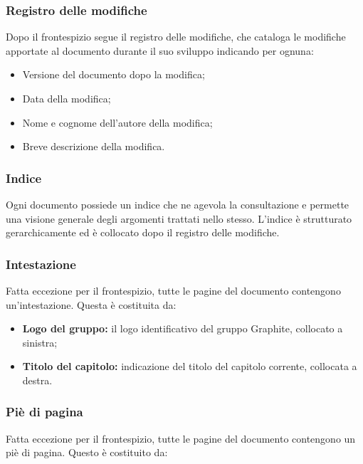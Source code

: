 \documentclass[../NormediProgetto.tex]{subfiles}
\begin{document}
\subsubsection{Registro delle modifiche}

Dopo il frontespizio segue il registro delle modifiche, che cataloga le modifiche apportate al documento durante il suo sviluppo indicando per ognuna:

\begin{itemize}
	\item Versione del documento dopo la modifica;
	\item Data della modifica;
	\item Nome e cognome dell'autore della modifica;
	\item Breve descrizione della modifica.
\end{itemize}

\subsubsection{Indice}

Ogni documento possiede un indice che ne agevola la consultazione e permette una visione generale degli argomenti trattati nello stesso. L'indice è strutturato gerarchicamente ed è collocato dopo il registro delle modifiche.

\subsubsection{Intestazione}

Fatta eccezione per il frontespizio, tutte le pagine del documento contengono un’intestazione. Questa è costituita da: 

\begin{itemize}
	\item \textbf{Logo del gruppo:} il logo identificativo del gruppo Graphite, collocato a sinistra;
	\item \textbf{Titolo del capitolo:} indicazione del titolo del capitolo corrente, collocata a destra.
\end{itemize}

\subsubsection{Piè di pagina}

Fatta eccezione per il frontespizio, tutte le pagine del documento contengono un piè di pagina. Questo è costituito da: 
\end{document}
